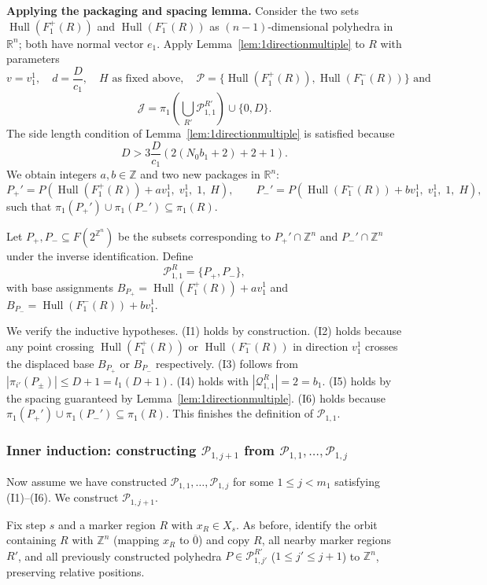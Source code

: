 \documentclass[10pt,a4paper]{amsart}
\DeclareMathOperator{\Hull}{Hull}
\begin{document}
\medskip
\noindent\textbf{Applying the packaging and spacing lemma.}
Consider the two sets $\Hull(F_1^+(R))$ and $\Hull(F_1^-(R))$ as
$(n-1)$-dimensional polyhedra in $\mathbb{R}^n$; both have normal vector
$e_1$. Apply Lemma~\ref{lem:1directionmultiple} to $R$ with parameters
\[
v=v_1^1,\quad d=\frac{D}{c_1},\quad H\text{ as fixed above},\quad
\mathcal{P}=\{\Hull(F_1^+(R)),\Hull(F_1^-(R))\} \text{ and}
\]
\[
\mathcal{J}=\pi_1\left (\bigcup_{R'}
\mathcal{P}_{1,1}^{R'}\right )\cup\{0, D\}.
\]
The side length condition of Lemma~\ref{lem:1directionmultiple} is
satisfied because
\[
D > 3\frac{D}{c_1}(2(N_0b_1+2)+2+1).
\]
 We obtain integers $a,b\in\mathbb{Z}$ and two
new packages in $\mathbb{R}^n$:
\[
P_+'=P(\Hull(F_1^+(R))+av_1^1,\; v_1^1,\; 1,\; H),\qquad
P_-'=P(\Hull(F_1^-(R))+bv_1^1,\; v_1^1,\; 1,\; H),
\]
such that $\pi_1(P_+')\cup\pi_1(P_-')\subseteq\pi_1(R)$.

Let $P_+, P_-\subseteq F(2^{\mathbb{Z}^n})$ be the subsets corresponding
to $P_+'\cap\mathbb{Z}^n$ and $P_-'\cap\mathbb{Z}^n$ under the inverse
identification. Define
\[
\mathcal{P}_{1,1}^R=\{P_+, P_-\},
\]
with base assignments
$B_{P_+}=\Hull(F_1^+(R))+av_1^1$ and
$B_{P_-}=\Hull(F_1^-(R))+bv_1^1$.

We verify the inductive hypotheses. (I1) holds by construction. (I2) holds
because any point crossing $\Hull(F_1^+(R))$ or $\Hull(F_1^-(R))$ in
direction $v_1^1$ crosses the displaced base $B_{P_+}$ or $B_{P_-}$
respectively. (I3) follows from
$|\pi_{i'}(P_\pm)|\leq D+1 = l_1(D+1)$. (I4) holds with
$|\mathcal{Q}_{1,1}^R|=2=b_1$. (I5) holds by the spacing guaranteed by
Lemma~\ref{lem:1directionmultiple}. (I6) holds because $\pi_1(P_+')\cup\pi_1(P_-')\subseteq\pi_1(R)$. This finishes the definition of $\mathcal{P}_{1,1}$.


\subsubsection{Inner induction: constructing $\mathcal{P}_{1,j+1}$ from
$\mathcal{P}_{1,1},\dots,\mathcal{P}_{1,j}$}

Now assume we have constructed
$\mathcal{P}_{1,1},\dots,\mathcal{P}_{1,j}$ for some $1\leq j<m_1$
satisfying (I1)--(I6). We construct $\mathcal{P}_{1,j+1}$.

Fix step $s$ and a marker region $R$ with $x_R\in X_s$. As before,
identify the orbit containing $R$ with $\mathbb{Z}^n$ (mapping $x_R$
to $\overline{0}$) and copy $R$, all nearby marker regions $R'$, and
all previously constructed polyhedra
$P\in\mathcal{P}_{1,j'}^{R'}$ ($1\leq j'\leq j+1$) to $\mathbb{Z}^n$,
preserving relative positions.
\end{document}
